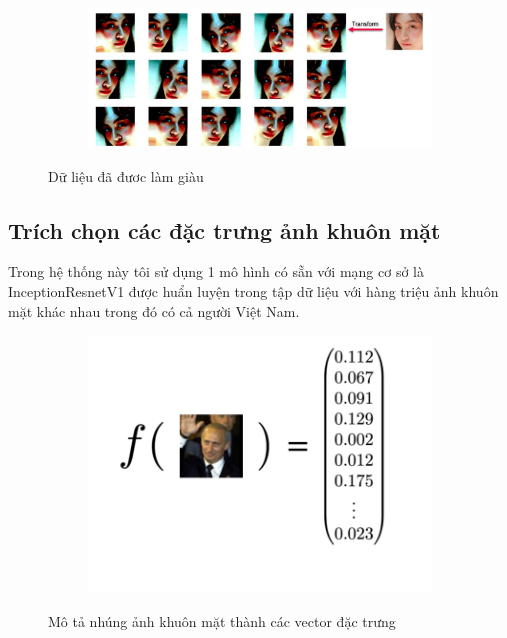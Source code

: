 \begin{figure}
    \begin{subfigure}{1\textwidth}
        \includegraphics[width=1\linewidth]{Chapters/items/chap3_4.jpg}
        \label{fig:chap3_4}
    \end{subfigure}
    \caption{Dữ liệu đã đươc làm giàu}
\end{figure}

\subsection{Trích chọn các đặc trưng ảnh khuôn mặt}
Trong hệ thống này tôi sử dụng 1 mô hình có sẵn với mạng cơ sở là InceptionResnetV1 được
huẩn luyện trong tập dữ liệu với hàng triệu ảnh khuôn mặt khác nhau trong đó có cả người Việt Nam.

\begin{figure}
    \begin{subfigure}{0.4\textwidth}
        \includegraphics[width=1\linewidth]{Chapters/items/embed.png}
        \label{fig:embed}
    \end{subfigure}
    \caption{Mô tả nhúng ảnh khuôn mặt thành các vector đặc trưng}
\end{figure}

